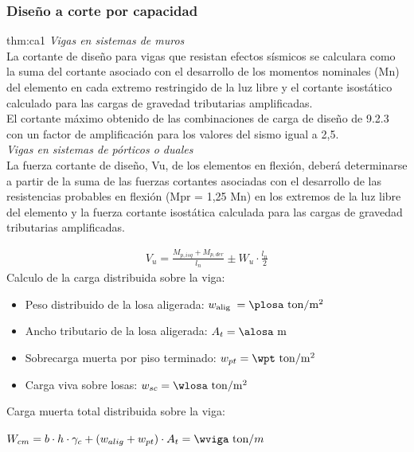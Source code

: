\subsubsection{Diseño a corte por capacidad}
\begin{theo}[Art. 21.4.3 y 21.5.4.1:]{thm:ca1}
\textit{Vigas en sistemas de muros}\\
La cortante de diseño para vigas que resistan efectos sísmicos se calculara como la suma del cortante asociado con el desarrollo de los momentos nominales (Mn) del elemento en cada extremo restringido de la luz libre y el cortante isostático calculado para las cargas de gravedad tributarias amplificadas.\\
El cortante máximo obtenido de las combinaciones de carga de diseño de 9.2.3 con un factor de amplificación para los valores del sismo igual a 2,5.\\
\textit{Vigas en sistemas de pórticos o duales}\\
La fuerza cortante de diseño, Vu, de los elementos en flexión, deberá determinarse a partir de la suma de las fuerzas cortantes asociadas con el desarrollo de las resistencias probables en flexión (Mpr = 1,25 Mn) en los extremos de la luz libre del elemento y la fuerza cortante isostática calculada para las cargas de gravedad tributarias amplificadas.
\end{theo}
\begin{align}
V_{u}=\frac{M_{p, i s q}+M_{p, d e r}}{l_{n}} \pm W_{u} \cdot \frac{l_{n}}{2}
\end{align}
\noindent Calculo de la carga distribuida sobre la viga:
\FPset{}
\FPset{}
\FPset{}
\FPset{}
\begin{itemize}
  \item Peso distribuido de la losa aligerada: $w_{\text {alig }}=\plosa \mathrm{~ton} / \mathrm{m}^{2}$
  \item Ancho tributario de la losa aligerada: $A_{t}=\alosa \mathrm{~m}$
  \item Sobrecarga muerta por piso terminado: $w_{p t}=\wpt \mathrm{~ton}/ \mathrm{m}^{2}$
  \item Carga viva sobre losas: $w_{sc}=\wlosa \mathrm{~ton}/\mathrm{m}^{2}$
\end{itemize}
\newpage
\noindent Carga muerta total distribuida sobre la viga:
\begin{center}
$W_{c m}=b \cdot h \cdot \gamma_{c}+\left(w_{a l i g}+w_{p t}\right) \cdot A_{t}=\wviga \text {~ton}/{m}$
\end{center}
